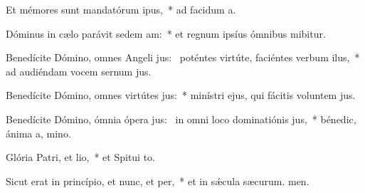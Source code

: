 \item Et mémores sunt mandatórum ipus,~* ad facidum a.
\item Dóminus in cælo parávit sedem am:~* et regnum ipsíus ómnibus mibitur.
\item Benedícite Dómino, omnes Angeli jus:~\pscross{} poténtes virtúte, faciéntes verbum ilus,~* ad audiéndam vocem sernum jus.
\item Benedícite Dómino, omnes virtútes jus:~* minístri ejus, qui fácitis voluntem jus.
\item Benedícite Dómino, ómnia ópera jus:~\pscross{} in omni loco dominatiónis jus,~* bénedic, ánima a, mino.
\item Glória Patri, et lio,~* et Spitui to.
\item Sicut erat in princípio, et nunc, et per,~* et in sǽcula sæcurum. men.
